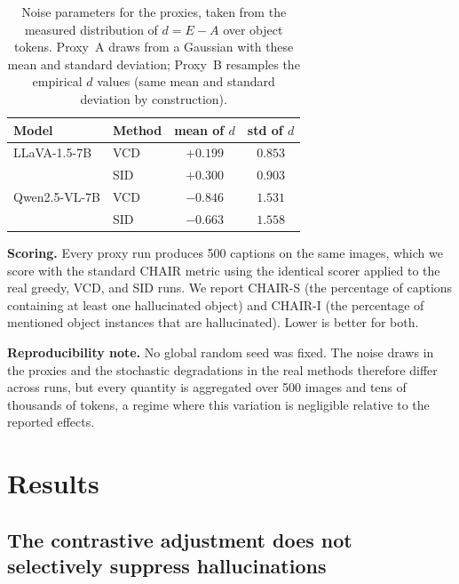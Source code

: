 \documentclass{article}
\begin{document}
\begin{table}[t]
\centering
\small
\caption{Noise parameters for the proxies, taken from the measured distribution
of $d = E - A$ over object tokens. Proxy~A draws from a Gaussian with these mean
and standard deviation; Proxy~B resamples the empirical $d$ values (same mean and
standard deviation by construction).}
\label{tab:dproxy-noise}
\begin{tabular}{llcc}
\toprule
Model & Method & mean of $d$ & std of $d$ \\
\midrule
LLaVA-1.5-7B & VCD & $+0.199$ & $0.853$ \\
 & SID & $+0.300$ & $0.903$ \\
Qwen2.5-VL-7B & VCD & $-0.846$ & $1.531$ \\
 & SID & $-0.663$ & $1.558$ \\
\bottomrule
\end{tabular}
\end{table}

\textbf{Scoring.} Every proxy run produces 500 captions on the same images, which
we score with the standard CHAIR metric using the identical scorer applied to the
real greedy, VCD, and SID runs. We report CHAIR-S (the percentage of captions
containing at least one hallucinated object) and CHAIR-I (the percentage of
mentioned object instances that are hallucinated). Lower is better for both.

\textbf{Reproducibility note.} No global random seed was fixed. The noise draws
in the proxies and the stochastic degradations in the real methods therefore
differ across runs, but every quantity is aggregated over 500 images and tens of
thousands of tokens, a regime where this variation is negligible relative to the
reported effects.


\section{Results}
\label{sec:dproxy-results}

\subsection{The contrastive adjustment does not selectively suppress hallucinations}
\label{subsec:dproxy-res-d}
\end{document}
